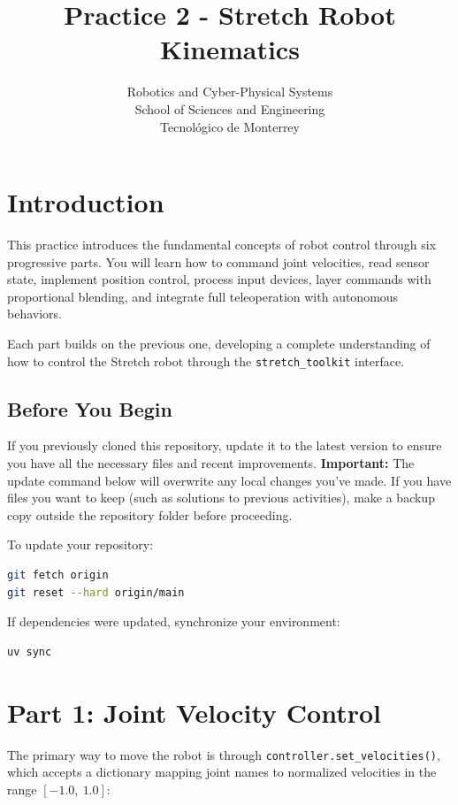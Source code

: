 \documentclass[11pt,a4paper]{article}
\title{\textbf{Practice 2 - Stretch Robot Kinematics}}
\author{
    Robotics and Cyber-Physical Systems \\
    School of Sciences and Engineering \\
    Tecnol\'ogico de Monterrey
}
\date{}
\begin{document}
\maketitle

\section*{Introduction}

This practice introduces the fundamental concepts of robot control through six progressive parts. You will learn how to command joint velocities, read sensor state, implement position control, process input devices, layer commands with proportional blending, and integrate full teleoperation with autonomous behaviors.

Each part builds on the previous one, developing a complete understanding of how to control the Stretch robot through the \texttt{stretch\_toolkit} interface.

\subsection*{Before You Begin}

If you previously cloned this repository, update it to the latest version to ensure you have all the necessary files and recent improvements. \textbf{Important:} The update command below will overwrite any local changes you've made. If you have files you want to keep (such as solutions to previous activities), make a backup copy outside the repository folder before proceeding.

To update your repository:

\begin{lstlisting}[language=bash]
git fetch origin
git reset --hard origin/main
\end{lstlisting}

If dependencies were updated, synchronize your environment:

\begin{lstlisting}[language=bash]
uv sync
\end{lstlisting}

\section{Part 1: Joint Velocity Control}

The primary way to move the robot is through \texttt{controller.set\_velocities()}, which accepts a dictionary mapping joint names to normalized velocities in the range $[-1.0,\ 1.0]$:
\end{document}
